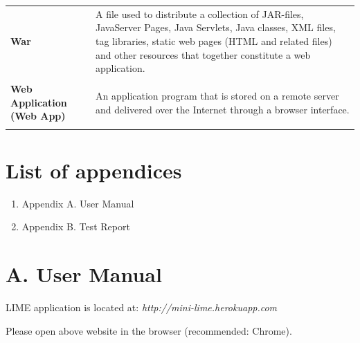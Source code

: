 \documentclass[a4paper,11pt,twoside]{report}
\theoremstyle{definition}
\begin{document}
\begin{longtable}{p{4cm} p{11cm}}
\textbf{War } & A file used to distribute a collection of JAR-files, JavaServer Pages, Java Servlets, Java classes, XML files, tag libraries, static web pages (HTML and related files) and other resources that together constitute a web application. \\ \\
\textbf{Web Application (Web App)} & An application program that is stored on a remote server and delivered over the Internet through a browser interface.\\ \\


\end{longtable}

\thispagestyle{empty}


\listoffigures
\thispagestyle{empty}



\renewcommand{\listtablename}{List of tables}
\listoftables
\thispagestyle{empty}


\chapter*{List of appendices}
\begin{enumerate}
\item Appendix A. User Manual
\item Appendix B. Test Report
\end{enumerate}
\thispagestyle{empty}


\chapter*{A. User Manual}


LIME application is located at: \textit{http://mini-lime.herokuapp.com}

Please open above website in the browser (recommended: Chrome).
\end{document}

